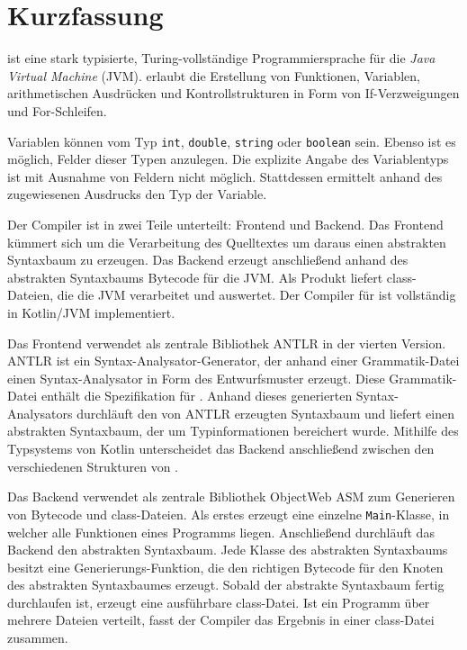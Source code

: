 \chapter{Kurzfassung}

\Toya ist eine stark typisierte, Turing-vollständige Programmiersprache für die \textit{Java Virtual Machine} (JVM). \Toya erlaubt die Erstellung von Funktionen, Variablen, arithmetischen Ausdrücken und Kontrollstrukturen in Form von If-Verzweigungen und For-Schleifen.

Variablen können vom Typ \texttt{int}, \texttt{double}, \texttt{string} oder \texttt{boolean} sein. Ebenso ist es möglich, Felder dieser Typen anzulegen. Die explizite Angabe des Variablentyps ist mit Ausnahme von Feldern nicht möglich. Stattdessen ermittelt \toya anhand des zugewiesenen Ausdrucks den Typ der Variable.

Der \toya Compiler ist in zwei Teile unterteilt: Frontend und Backend. Das Frontend kümmert sich um die Verarbeitung des Quelltextes um daraus einen abstrakten Syntaxbaum zu erzeugen. Das Backend erzeugt anschließend anhand des abstrakten Syntaxbaums Bytecode für die JVM. Als Produkt liefert \toya class-Dateien, die die JVM verarbeitet und auswertet. Der Compiler für \toya ist vollständig in Kotlin/JVM implementiert.

Das Frontend verwendet als zentrale Bibliothek ANTLR in der vierten Version. ANTLR ist ein Syntax-Analysator-Generator, der anhand einer Grammatik-Datei einen Syntax-Analysator in Form des \visitor Entwurfsmuster erzeugt. Diese Grammatik-Datei enthält die Spezifikation für \toya.
Anhand dieses generierten Syntax-Analysators durchläuft \toya den von ANTLR erzeugten Syntaxbaum und liefert einen abstrakten Syntaxbaum, der um Typinformationen bereichert wurde. Mithilfe des Typsystems von Kotlin unterscheidet das Backend anschließend zwischen den verschiedenen Strukturen von \toya.

Das Backend verwendet als zentrale Bibliothek ObjectWeb ASM zum Generieren von Bytecode und class-Dateien. Als erstes erzeugt \toya eine einzelne \texttt{Main}-Klasse, in welcher alle Funktionen eines \toya Programms liegen. Anschließend durchläuft das Backend den abstrakten Syntaxbaum. Jede Klasse des abstrakten Syntaxbaums besitzt eine Generierungs-Funktion, die den richtigen Bytecode für den Knoten des abstrakten Syntaxbaumes erzeugt. Sobald der abstrakte Syntaxbaum fertig durchlaufen ist, erzeugt \toya eine ausführbare class-Datei. Ist ein \toya Programm über mehrere Dateien verteilt, fasst der Compiler das Ergebnis in einer class-Datei zusammen.